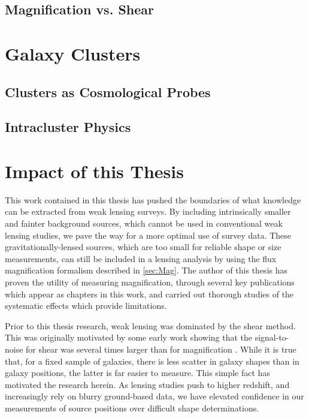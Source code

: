 \subsection{Magnification vs. Shear}

\section{Galaxy Clusters}
\label{sec:Clusters}

\subsection{Clusters as Cosmological Probes}

\subsection{Intracluster Physics}

\section{Impact of this Thesis}
\label{sec:Impact}

This work contained in this thesis has pushed the boundaries of what knowledge can be extracted from weak lensing surveys. By including intrinsically smaller and fainter background sources, which cannot be used in conventional weak lensing studies, we pave the way for a more optimal use of survey data. These gravitationally-lensed sources, which are too small for reliable shape or size measurements, can still be included in a lensing analysis by using the flux magnification formalism described in \autoref{sec:Mag}. The author of this thesis has proven the utility of measuring magnification, through several key publications which appear as chapters in this work, and carried out thorough studies of the systematic effects which provide limitations. 

Prior to this thesis research, weak lensing was dominated by the shear method. This was originally motivated by some early work showing that the signal-to-noise for shear was several times larger than for magnification \citep{Schneider00}. While it is true that, for a fixed sample of galaxies, there is less scatter in galaxy shapes than in galaxy positions, the latter is far easier to measure. This simple fact has motivated the research herein. As lensing studies push to higher redshift, and increasingly rely on blurry ground-based data, we have elevated confidence in our measurements of source positions over difficult shape determinations. 


